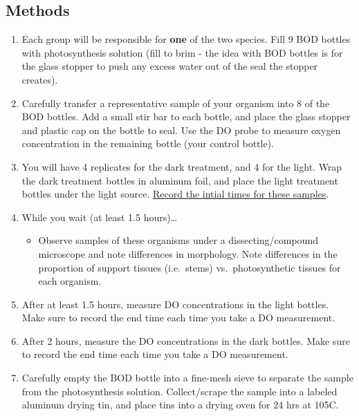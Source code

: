 \documentclass[11pt,]{article}
\providecommand{\tightlist}{%
\setlength{\itemsep}{0pt}\setlength{\parskip}{0pt}}
\begin{document}
\hypertarget{methods}{%
\subsection{Methods}\label{methods}}

\begin{enumerate}
\def\labelenumi{\arabic{enumi}.}
\tightlist
\item
  Each group will be responsible for \textbf{one} of the two species.
  Fill 9 BOD bottles with photosynthesis solution (fill to brim - the
  idea with BOD bottles is for the glass stopper to push any excess
  water out of the seal the stopper creates).
\item
  Carefully transfer a representative sample of your organism into 8 of
  the BOD bottles. Add a small stir bar to each bottle, and place the
  glass stopper and plastic cap on the bottle to seal. Use the DO probe
  to measure oxygen concentration in the remaining bottle (your control
  bottle).
\item
  You will have 4 replicates for the dark treatment, and 4 for the
  light. Wrap the dark treatment bottles in aluminum foil, and place the
  light treatment bottles under the light source.
  \underline{Record the intial times for these samples}.
\item
  While you wait (at least 1.5 hours)\ldots{}

  \begin{itemize}
  \tightlist
  \item
    Observe samples of these organisms under a dissecting/compound
    microscope and note differences in morphology. Note differences in
    the proportion of support tissues (i.e.~stems) vs.~photosynthetic
    tissues for each organism.
  \end{itemize}
\item
  After at least 1.5 hours, measure DO concentrations in the light
  bottles. Make sure to record the end time each time you take a DO
  measurement.
\item
  After 2 hours, measure the DO concentrations in the dark bottles. Make
  sure to record the end time each time you take a DO measurement.
\item
  Carefully empty the BOD bottle into a fine-mesh sieve to separate the
  sample from the photosynthesis solution. Collect/scrape the sample
  into a labeled aluminum drying tin, and place tins into a drying oven
  for 24 hrs at 105\textdegree{}C.
\end{enumerate}
\end{document}
